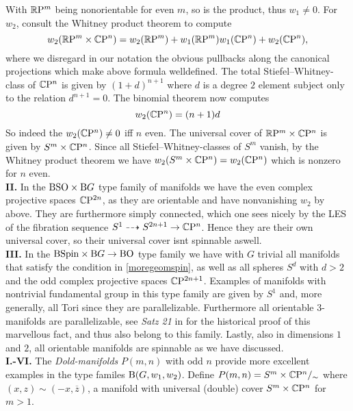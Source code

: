         With $\mathbb{R}\mathrm{P}^m$ being nonorientable for even $m$, so is the product, thus $w_1\neq 0$.
        For $w_2$, consult the Whitney product theorem to compute
        \begin{equation*}
                w_2(\mathbb{R}\mathrm{P}^m\times\mathbb{C}\mathrm{P}^n) = w_2(\mathbb{R}\mathrm{P}^m) + w_1(\mathbb{R}\mathrm{P}^m)w_1(\mathbb{C}\mathrm{P}^n) + w_2(\mathbb{C}\mathrm{P}^n),
        \end{equation*}
        where we disregard in our notation the obvious pullbacks along the canonical projections which make above formula welldefined.
        The total Stiefel--Whitney-class of $\mathbb{C}\mathrm{P}^n$ is given by $(1+d)^{n+1}$ where $d$ is a degree $2$ element subject only to the relation $d^{n+1}= 0$.
        The binomial theorem now computes
        \begin{equation*}
                w_2(\mathbb{C}\mathrm{P}^n) = (n+1)d
        \end{equation*}
        So indeed the $w_2(\mathbb{C}\mathrm{P}^n) \neq 0$ iff $n$ even.
        The universal cover of $\mathbb{R}\mathrm{P}^m\times\mathbb{C}\mathrm{P}^n$ is given by $S^m\times\mathbb{C}\mathrm{P}^n$.
        Since all Stiefel--Whitney-classes of $S^m$ vanish, by the Whitney product theorem we have $w_2(S^m\times\mathbb{C}\mathrm{P}^n) = w_2(\mathbb{C}\mathrm{P}^n)$ which is nonzero for $n$ even.\\
\textbf{II.} In the $\mathrm{BSO}\times \mathrm{B} G$ type family of manifolds we have the even complex projective spaces $\mathbb{C}\mathrm{P}^{2n}$, as they are orientable  and have nonvanishing $w_2$ by above. 
        They are furthermore simply connected, which one sees nicely by the LES of the fibration sequence $S^1 \dashrightarrow S^{2n+1} \to \mathbb{C}\mathrm{P}^n$.
        Hence they are their own universal cover, so their universal cover isnt spinnable aswell.\\
\textbf{III.} In the $\mathrm{BSpin}\times\mathrm{B} G \to \mathrm{BO}$ type family we have with $G$ trivial all manifolds that satisfy the condition in \ref{moregeomspin}, as well as all spheres $S^d$ with $d>2$ and the odd complex projective spaces $\mathbb{C}\mathrm{P}^{2n+1}$.
        Examples of manifolds with nontrivial fundamental group in this type family are given by $S^1$ and, more generally, all Tori since they are parallelizable.
        Furthermore all orientable $3$-manifolds are parallelizable, see \emph{Satz 21} in \cite{stiefel:cc} for the historical proof of this marvellous fact, and thus also belong to this family.
        Lastly, also in dimensions $1$ and $2$, all orientable manifolds are spinnable as we have discussed.\\
\textbf{I.-VI.} The \hypertarget{doldmnf}{\emph{Dold-manifolds}} $P(m,n)$ with odd $n$ provide more excellent examples in the type familes $\mathrm{B}(G,w_1,w_2)$.
        Define $P(m,n) = S^m\times\mathbb{C}\mathrm{P}^n /_\sim$ where $(x,z) \sim (-x,\overline{z})$, a manifold with universal (double) cover $S^m\times\mathbb{C}\mathrm{P}^n$ for $m>1$.
